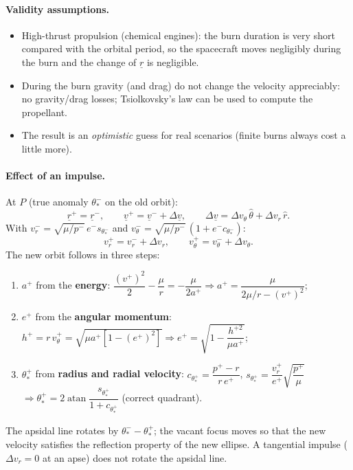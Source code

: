 \paragraph{Validity assumptions.}
\begin{itemize}
\item High-thrust propulsion (chemical engines): the burn duration is very short compared with the orbital period, so the
spacecraft moves negligibly during the burn and the change of $\underline r$ is negligible.
\item During the burn gravity (and drag) do not change the velocity appreciably: no gravity/drag losses; Tsiolkovsky's law
can be used to compute the propellant.
\item The result is an \emph{optimistic} guess for real scenarios (finite burns always cost a little more).
\end{itemize}

\paragraph{Effect of an impulse.} At $P$ (true anomaly $\theta_*^-$ on the old orbit):
\begin{equation}
\underline r^+=\underline r^-,\qquad \underline v^+=\underline v^-+\Delta\underline v,\qquad
\Delta\underline v=\Delta v_\theta\,\hat\theta+\Delta v_r\,\hat r .
\end{equation}
With $v_r^-=\sqrt{\mu/p^-}\,e^-s_{\theta_*^-}$ and $v_\theta^-=\sqrt{\mu/p^-}\,(1+e^-c_{\theta_*^-})$:
\begin{equation}
v_r^+=v_r^-+\Delta v_r,\qquad v_\theta^+=v_\theta^-+\Delta v_\theta .
\end{equation}
The new orbit follows in three steps:
\begin{enumerate}
\item $a^+$ from the \textbf{energy}: $\dfrac{(v^+)^2}{2}-\dfrac{\mu}{r}=-\dfrac{\mu}{2a^+}\Rightarrow a^+=\dfrac{\mu}{2\mu/r-(v^+)^2}$;
\item $e^+$ from the \textbf{angular momentum}: $h^+=r\,v_\theta^+=\sqrt{\mu a^+[1-(e^+)^2]}\Rightarrow e^+=\sqrt{1-\dfrac{h^{+2}}{\mu a^+}}$;
\item $\theta_*^+$ from \textbf{radius and radial velocity}: $c_{\theta_*^+}=\dfrac{p^+-r}{r\,e^+}$, $s_{\theta_*^+}=\dfrac{v_r^+}{e^+}\sqrt{\dfrac{p^+}{\mu}}$
$\Rightarrow\theta_*^+=2\operatorname{atan}\dfrac{s_{\theta_*^+}}{1+c_{\theta_*^+}}$ (correct quadrant).
\end{enumerate}
The apsidal line rotates by $\theta_*^--\theta_*^+$; the vacant focus moves so that the new velocity satisfies the reflection
property of the new ellipse. A tangential impulse ($\Delta v_r=0$ at an apse) does not rotate the apsidal line.


